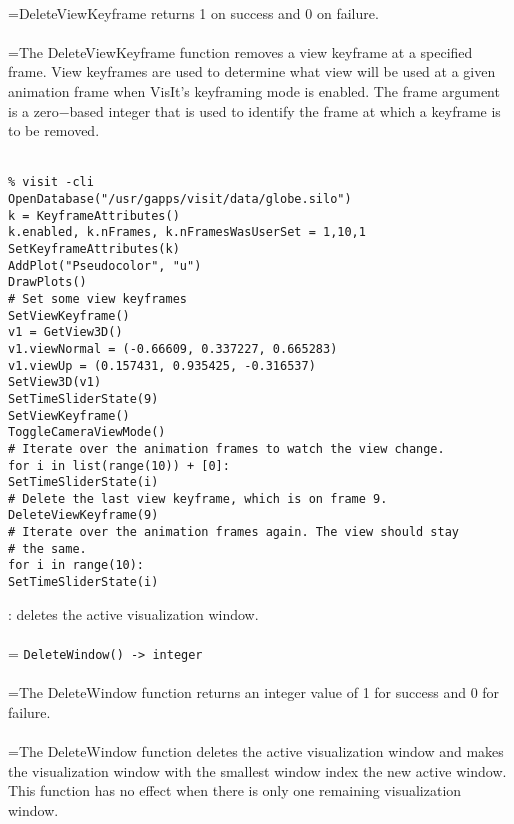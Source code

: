 \documentclass[10pt,a4paper]{report}
\begin{document}
 \\ 
\hangindent=\parindent DeleteViewKeyframe returns 1 on success and 0 on failure. \\[-3mm] 

 \\ 
\hangindent=\parindent The DeleteViewKeyframe function removes a view keyframe at a specified frame. View keyframes are used to determine what view will be used at a given animation frame when VisIt's keyframing mode is enabled. The frame argument is a zero$-$based integer that is used to identify the frame at which a keyframe is to be removed. \\[-3mm] 

\\[-6mm]
\begin{verbatim}% visit -cli
OpenDatabase("/usr/gapps/visit/data/globe.silo")
k = KeyframeAttributes()
k.enabled, k.nFrames, k.nFramesWasUserSet = 1,10,1
SetKeyframeAttributes(k)
AddPlot("Pseudocolor", "u")
DrawPlots()
# Set some view keyframes
SetViewKeyframe()
v1 = GetView3D()
v1.viewNormal = (-0.66609, 0.337227, 0.665283)
v1.viewUp = (0.157431, 0.935425, -0.316537)
SetView3D(v1)
SetTimeSliderState(9)
SetViewKeyframe()
ToggleCameraViewMode()
# Iterate over the animation frames to watch the view change.
for i in list(range(10)) + [0]:
SetTimeSliderState(i)
# Delete the last view keyframe, which is on frame 9.
DeleteViewKeyframe(9)
# Iterate over the animation frames again. The view should stay 
# the same.
for i in range(10):
SetTimeSliderState(i)
\end{verbatim}
\newpage


{}
: deletes the active visualization window.\\[-3mm]

 \\ 
\hangindent=\parindent 
\verb!DeleteWindow() -> integer!\\ [-3mm]

 \\ 
\hangindent=\parindent The DeleteWindow function returns an integer value of 1 for success and 0 for failure. \\[-3mm] 

 \\ 
\hangindent=\parindent The DeleteWindow function deletes the active visualization window and makes the visualization window with the smallest window index the new active window. This function has no effect when there is only one remaining visualization window. \\[-3mm] 
\end{document}
